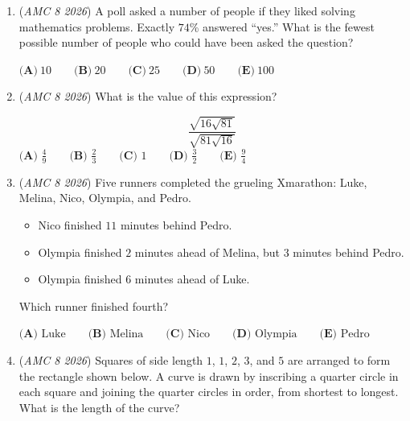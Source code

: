 \begin{enumerate}
	\item (\textit{AMC 8 2026}) A poll asked a number of people if they liked solving mathematics problems. Exactly $74$\% answered “yes.” What is the fewest possible number of people who could have been asked the question?


 $\textbf{(A)}\ 10 \qquad \textbf{(B)}\ 20 \qquad \textbf{(C)}\ 25 \qquad \textbf{(D)}\ 50 \qquad \textbf{(E)}\ 100$


	\item (\textit{AMC 8 2026}) What is the value of this expression?


 
 \[\frac{\sqrt{16\sqrt{81}}}{\sqrt{81\sqrt{16}}}\]
$\textbf{(A) } \frac{4}{9}\qquad\textbf{(B) } \frac{2}{3}\qquad\textbf{(C) } 1\qquad\textbf{(D) } \frac{3}{2}\qquad\textbf{(E) } \frac{9}{4}$


	\item (\textit{AMC 8 2026}) Five runners completed the grueling Xmarathon: Luke, Melina, Nico, Olympia, and Pedro.


 
            \begin{itemize}
        \item Nico finished $11$ minutes behind Pedro.
            \end{itemize}
            
            \begin{itemize}
        \item Olympia finished $2$ minutes ahead of Melina, but $3$ minutes behind Pedro.
            \end{itemize}
            
            \begin{itemize}
        \item Olympia finished $6$ minutes ahead of Luke.
            \end{itemize}
            Which runner finished fourth?


 $\textbf{(A) }\text{Luke} \qquad \textbf{(B) }\text{Melina} \qquad \textbf{(C) }\text{Nico} \qquad \textbf{(D) }\text{Olympia}\qquad \textbf{(E) }\text{Pedro}$


	\item (\textit{AMC 8 2026}) Squares of side length $1$, $1$, $2$, $3$, and $5$ are arranged to form the rectangle shown below. A curve is drawn by inscribing a quarter circle in each square and joining the quarter circles in order, from shortest to longest. What is the length of the curve?



\end{enumerate}
